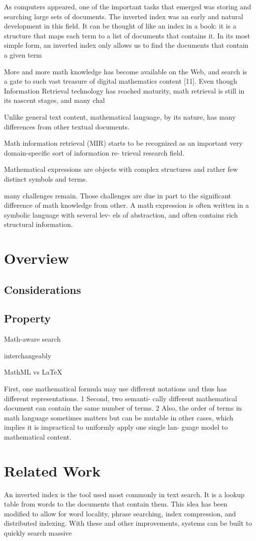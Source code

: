 As computers appeared, one of the important tasks that emerged was
storing and searching large sets of documents. The inverted index was an
early and natural development in this field. It can be thought of like an index
in a book: it is a structure that maps each term to a list of documents that
contains it. In its most simple form, an inverted index only allows us to find
the documents that contain a given term

More and more math knowledge has become available on the Web, and search
is a gate to such vast treasure of digital mathematics content [11]. Even though
Information Retrieval technology has reached maturity, math retrieval is still in
its nascent stages, and many chal

Unlike general text content, mathematical language, by its nature, has many differences from other textual documents. 

Math information retrieval (MIR) starts to be recognized
as an important very domain-specific sort of information re-
trieval research field.

Mathematical expressions are objects with complex
structures and rather few distinct symbols and terms.

many challenges remain. Those challenges are due in part
to the significant difference of math knowledge from other.
A math expression is often written in a symbolic language with several lev-
els of abstraction, and often contains rich structural information.

\section{Overview}
\subsection{Considerations}
\subsection{Property}
Math-aware search \cite{ddd}

interchangeably 

MathML vs LaTeX

First,
one mathematical formula may use different notations and
thus has different representations. 1 Second, two semanti-
cally different mathematical document can contain the same
number of terms. 2 Also, the order of terms in math language
sometimes matters but can be mutable in other cases, which
implies it is impractical to uniformly apply one single lan-
guage model to mathematical content.

\section{Related Work}

An inverted index is the tool used most commonly in text search. It is
a lookup table from words to the documents that contain them. This idea has
been modified to allow for word locality, phrase searching, index compression,
and distributed indexing. With these and other improvements, systems can
be built to quickly search massive
